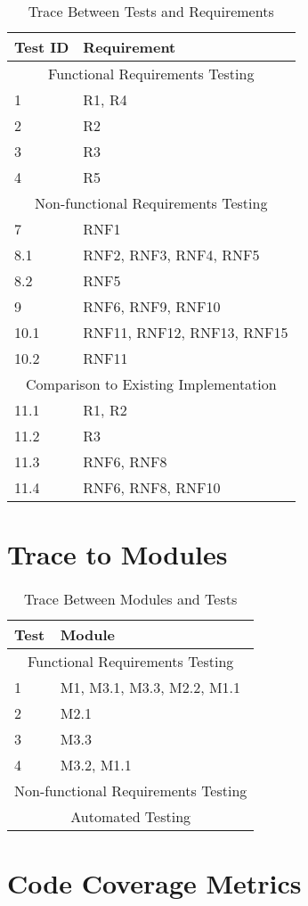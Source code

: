 \documentclass[12pt, titlepage]{article}
\begin{document}
\begin{table}[H!]
\centering
\begin{tabular}{p{} p{}}
\toprule
\textbf{Test ID} & \textbf{Requirement}\\
\midrule
\multicolumn{2}{c}{Functional Requirements Testing} \\
\midrule
1 & R1, R4 \\
2 & R2 \\
3 & R3 \\
4 & R5 \\

\midrule
\multicolumn{2}{c}{Non-functional Requirements Testing} \\

7 & RNF1\\
8.1 & RNF2, RNF3, RNF4, RNF5\\
8.2 & RNF5\\
9 &  RNF6, RNF9, RNF10\\
10.1 & RNF11, RNF12, RNF13, RNF15\\
10.2 & RNF11\\
\midrule
\multicolumn{2}{c}{Comparison to Existing Implementation} \\
11.1 & R1, R2\\
11.2 & R3\\
11.3 & RNF6, RNF8\\
11.4 & RNF6, RNF8, RNF10\\
\bottomrule
\end{tabular}
\caption{Trace Between Tests and Requirements}
\end{table}
		
\section{Trace to Modules} %

\begin{table}[H!]
\centering
\begin{tabular}{p{} p{}}
\toprule
\textbf{Test} & \textbf{Module}\\
\midrule
\multicolumn{2}{c}{Functional Requirements Testing} \\
\midrule
1 & M1, M3.1, M3.3, M2.2, M1.1 \\
2 & M2.1 \\
3 & M3.3 \\
4 & M3.2, M1.1 \\
\midrule
\multicolumn{2}{c}{Non-functional Requirements Testing} \\

\midrule

\midrule
\multicolumn{2}{c}{Automated Testing} \\
\midrule
\bottomrule
\end{tabular}
\caption{Trace Between Modules and Tests}
\end{table}
		

\section{Code Coverage Metrics} %


\end{document}
